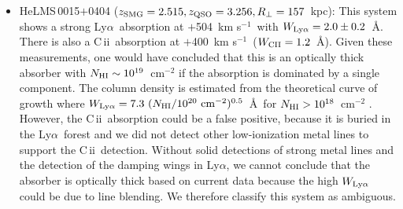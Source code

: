 \documentclass[iop,revtex4,twocolumn,apj,numberedappendix,appendixfloats]{emulateapj}
\newcommand{\kms}{{km s$^{-1}$}}
\newcommand{\lya}{Ly$\alpha$}
\newcommand{\HI}{H\,{\sc i}}
\newcommand{\CII}{C\,{\sc ii}}
\begin{document}
\begin{itemize}
\item HeLMS\,0015$+$0404 ($z_{\rm SMG} = 2.515, z_{\rm QSO} = 3.256, R_\bot = 157$~kpc): This system shows a strong \lya\ absorption at $+$504~\kms\ with $W_{\rm Ly\alpha} = 2.0\pm0.2$~\AA. There is also a \CII\ absorption at $+$400~\kms\ ($W_{\rm CII} = 1.2$~\AA). Given these measurements, one would have concluded that this is an optically thick absorber with $N_{\rm HI} \sim 10^{19}$~cm$^{-2}$ if the absorption is dominated by a single component. The column density is estimated from the theoretical curve of growth where $W_{\rm Ly\alpha} = 7.3~(N_{\rm HI}/10^{20}~{\rm cm}^{-2})^{0.5}$~\AA\ for $N_{\rm HI} > 10^{18}$~cm$^{-2}$ \citep[][\S16.4.4]{Mo10}.
However, the \CII\ absorption could be a false positive, because it is buried in the \lya\ forest and we did not detect other low-ionization metal lines to support the \CII\ detection. 
Without solid detections of strong metal lines and the detection of the damping wings in \lya, we cannot conclude that the absorber is optically thick based on current data because the high $W_{\rm Ly\alpha}$ could be due to line blending. We therefore classify this system as ambiguous.









\end{itemize}
\end{document}
